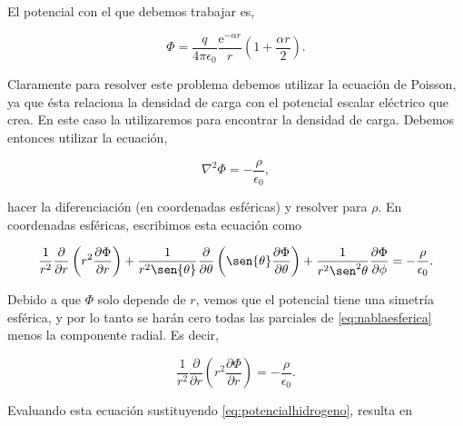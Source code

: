 \documentclass[a4paper,11pt]{article}
\numberwithin{equation}{section}
\newcommand{\euler}{\mathrm{e}}
\begin{document}
El potencial con el que debemos trabajar es, 

\begin{equation}
 \Phi = \frac{q}{4\pi\epsilon_0}\frac{\euler^{-\alpha r}}{r}\left(1 + 
\frac{\alpha r}{2}\right).
\label{eq:potencialhidrogeno}
\end{equation}

Claramente para resolver este problema debemos utilizar la ecuación de Poisson, ya 
que ésta relaciona la densidad de carga con el potencial escalar eléctrico que 
crea. En este caso la utilizaremos para encontrar la densidad de carga. Debemos entonces 
utilizar la ecuación, 

\begin{equation}
 \nabla^2 \Phi = - \frac{\rho}{\epsilon_0},
\end{equation}

hacer la diferenciación (en coordenadas esféricas) y resolver para $\rho$. En coordenadas 
esféricas, escribimos esta ecuación como 

\begin{equation}
 \frac{1}{r^2}\frac{\partial}{\partial r}\left(r^2\frac{\partial \Phi}{\partial r}\right) +
 \frac{1}{r^2\sen{\theta}}\frac{\partial}{\partial \theta}
 \left(\sen{\theta}\frac{\partial \Phi}{\partial \theta} \right) + 
 \frac{1}{r^2\sen^2{\theta}}\frac{\partial \Phi}{\partial \phi} = 
 - \frac{\rho}{\epsilon_0}.
 \label{eq:nablaesferica}
\end{equation}

Debido a que $\Phi$ solo depende de $r$, vemos que el potencial tiene una simetría 
esférica, y por lo tanto se harán cero todas las parciales de \eqref{eq:nablaesferica} 
menos la componente radial. Es decir, 

\begin{equation}
 \frac{1}{r^2}\frac{\partial}{\partial r}\left(r^2\frac{\partial \Phi}{\partial r}\right) = 
 - \frac{\rho}{\epsilon_0}.
\end{equation}

Evaluando esta ecuación sustituyendo \eqref{eq:potencialhidrogeno}, resulta en 
\end{document}
